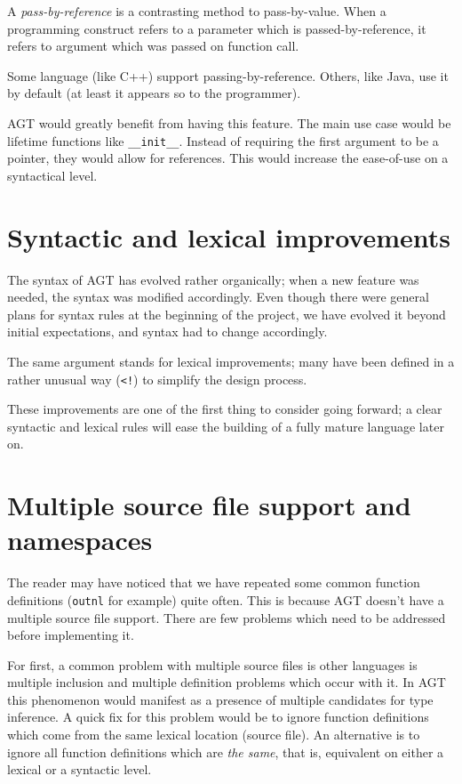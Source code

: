 \documentclass[times, utf8, diplomski]{fer}
\theoremstyle{definition}
\begin{document}
A \textit{pass-by-reference} is a contrasting method to pass-by-value. When a programming construct 
refers to a parameter which is passed-by-reference, it refers to argument which was passed on
function call.

Some language (like C++) support passing-by-reference. Others, like Java, use it by default 
(at least it appears so to the programmer).

AGT would greatly benefit from having this feature. The main use case would be
lifetime functions like \texttt{\_\_init\_\_}. Instead of requiring the first argument to be a pointer,
they would allow for references. This would increase the ease-of-use on a syntactical level.

\section{Syntactic and lexical improvements}

The syntax of AGT has evolved rather organically; when a new feature was needed,
the syntax was modified accordingly. Even though there were general plans for syntax rules
at the beginning of the project, we have evolved it beyond initial expectations,
and syntax had to change accordingly.

The same argument stands for lexical improvements; many have been defined in a rather unusual way
(\texttt{<!}) to simplify the design process.

These improvements are one of the first thing to consider going forward;
a clear syntactic and lexical rules will ease the building of a fully mature language later on.

\section{Multiple source file support and namespaces}

The reader may have noticed that we have repeated some common function definitions
(\texttt{outnl} for example) quite often. This is because AGT doesn't have a multiple source file
support. There are few problems which need to be addressed before implementing it.

For first, a common problem with multiple source files is other languages is multiple inclusion
and multiple definition problems which occur with it. In AGT this phenomenon would manifest
as a presence of multiple candidates for type inference. A quick fix for this problem would be
to ignore function definitions which come from the same lexical location (source file).
An alternative is to ignore all function definitions which are \textit{the same}, that is,
equivalent on either a lexical or a syntactic level.
\end{document}
